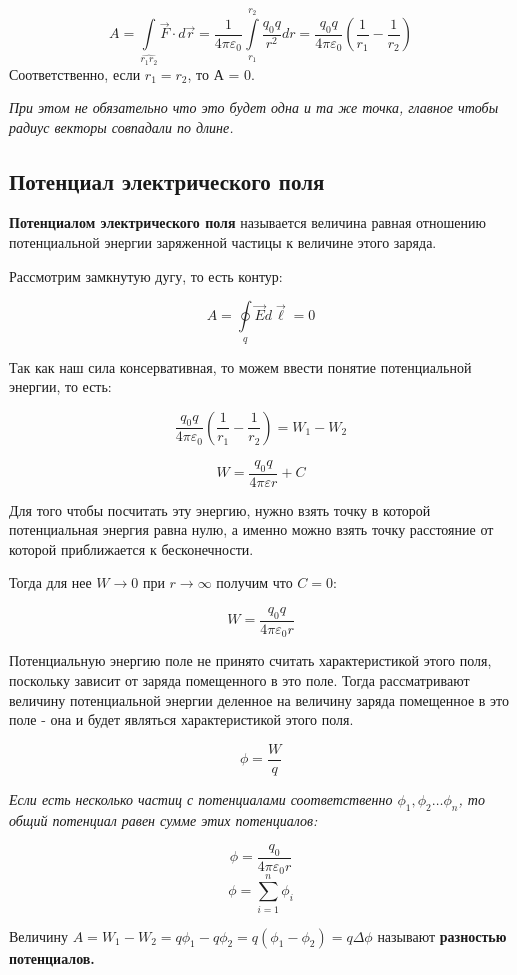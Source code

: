 \documentclass[../main.tex]{subfiles}
\begin{document}
\[ A = \int\limits_{\hat{r_1 r_2}} \vec{F} \cdot d\vec{r} = \frac{1}{4 \pi \varepsilon_0} \int\limits_{r_1}^{r_2} \frac{q_0 q}{r^2}dr = \frac{q_0 q}{4 \pi \varepsilon_0} \left(\frac{1}{r_1} - \frac{1}{r_2}\right) \]
Соответственно, если $r_1 = r_2$, то А = 0.

\textit{При этом не обязательно что это будет одна и та же точка, главное чтобы радиус векторы совпадали по длине.}

\subsection{Потенциал электрического поля}
 \textbf{Потенциалом электрического поля} называется величина равная отношению потенциальной энергии заряженной частицы к величине этого заряда.

Рассмотрим замкнутую дугу, то есть контур:

\[A = \oint\limits_q \vec{E} d\vec{\ell} = 0\]

Так как наш сила консервативная, то можем ввести понятие потенциальной энергии, то есть:

\[\frac{q_0 q}{4 \pi \varepsilon_0} \left(\frac{1}{r_1} - \frac{1}{r_2}\right) = W_1 - W_2\]

\[W = \frac{q_0 q}{4 \pi \varepsilon r} + C\]

Для того чтобы посчитать эту энергию, нужно взять точку в которой потенциальная энергия равна нулю, а именно можно взять точку расстояние от которой приближается к бесконечности.

\vspace{5px}

Тогда для нее $W \to 0$ при $r \to \infty$ получим что $C = 0$:

\[W = \frac{q_0 q}{4 \pi \varepsilon_0 r}\]


Потенциальную энергию поле не принято считать характеристикой этого поля, поскольку зависит от заряда помещенного в это поле.
Тогда рассматривают величину потенциальной энергии деленное на величину заряда помещенное в это поле - она и будет являться характеристикой этого поля.


\[\phi = \frac{W}{q}\]

\textit{Если есть несколько частиц с потенциалами соответственно $\phi_1, \phi_2 \ldots \phi_n$, то общий потенциал равен сумме этих потенциалов:}

\[\phi = \frac{q_0}{4 \pi \varepsilon_0 r} \]
\[\phi = \sum_{i = 1}^{n} \phi_i  \]

 Величину $A = W_1 - W_2 = q\phi_1 - q\phi_2 = q(\phi_1 - \phi_2) = q\Delta \phi$ называют \textbf{разностью потенциалов.}
\end{document}
